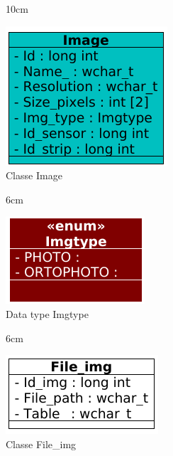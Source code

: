 \begin{figure}[!ht]{10cm}
  \caption{Classe Image} \label{img}
  \centering
  \includegraphics[width=0.5\hsize]{figuras/6.png}
\end{figure}

\begin{figure}[!ht]{6cm}
  \caption{Data type Imgtype} \label{imgt}
  \centering
  \includegraphics[width=0.8\hsize]{figuras/25.png}
\end{figure}

\begin{figure}[!ht]{6cm}
  \caption{Classe File\_img} \label{file}
  \centering
  \includegraphics[width=0.75\hsize]{figuras/19.png}
\end{figure}

